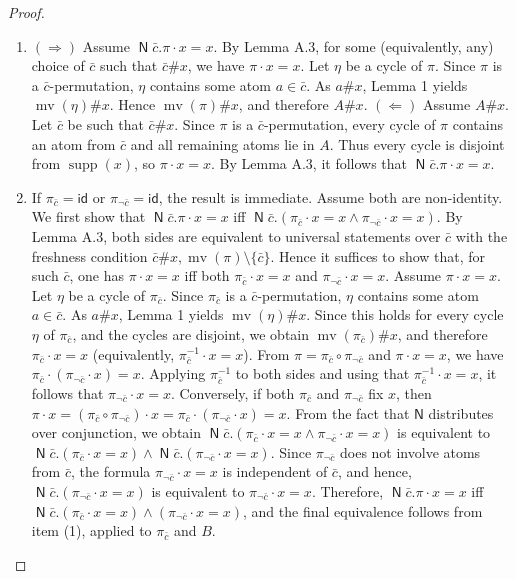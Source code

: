 \documentclass[10pt,a4paper]{amsart}
\newcommand{\newq}{\mathop{\mathsf N}}
\begin{document}
\begin{proof}
\begin{enumerate}
\item $(\Rightarrow)$ Assume $\newq\bar c.\pi\cdot x=x$.
By Lemma A.3, for some (equivalently, any) choice of $\bar c$ such that $\bar c\#x$, we have $\pi\cdot x=x$.
Let $\eta$ be a cycle of $\pi$. Since $\pi$ is a $\bar c$-permutation, $\eta$ contains some atom $a\in\bar c$.
As $a\#x$, Lemma 1 yields $\operatorname{mv}(\eta)\#x$. Hence $\operatorname{mv}(\pi)\#x$, and therefore $A\#x$.
$(\Leftarrow)$ Assume $A\#x$. Let $\bar c$ be such that $\bar c\#x$.
Since $\pi$ is a $\bar c$-permutation, every cycle of $\pi$ contains an atom from $\bar c$ and all remaining atoms lie in $A$.
Thus every cycle is disjoint from $\operatorname{supp}(x)$, so $\pi\cdot x=x$.
By Lemma A.3, it follows that $\newq\bar c.\pi\cdot x=x$.
\item If $\pi_{\bar c}=\mathsf{id}$ or $\pi_{\neg\bar c}=\mathsf{id}$, the result is immediate. Assume both are non-identity.
We first show that $\newq\bar c.\pi\cdot x=x$ iff $\newq\bar c.(\pi_{\bar c}\cdot x=x\land\pi_{\neg\bar c}\cdot x=x)$.
By Lemma A.3, both sides are equivalent to universal statements over $\bar c$ with the freshness condition $\bar c\#x,\operatorname{mv}(\pi)\setminus\{\bar c\}$.
Hence it suffices to show that, for such $\bar c$, one has $\pi\cdot x=x$ iff both $\pi_{\bar c}\cdot x=x$ and $\pi_{\neg\bar c}\cdot x=x$.
Assume $\pi\cdot x=x$. Let $\eta$ be a cycle of $\pi_{\bar c}$. Since $\pi_{\bar c}$ is a $\bar c$-permutation, $\eta$ contains some atom $a\in\bar c$.
As $a\#x$, Lemma 1 yields $\operatorname{mv}(\eta)\#x$. Since this holds for every cycle $\eta$ of $\pi_{\bar c}$, and the cycles are disjoint, we obtain $\operatorname{mv}(\pi_{\bar c})\#x$, and therefore $\pi_{\bar c}\cdot x=x$ (equivalently, $\pi_{\bar c}^{-1}\cdot x=x$).
From $\pi=\pi_{\bar c}\circ\pi_{\neg\bar c}$ and $\pi\cdot x=x$, we have $\pi_{\bar c}\cdot(\pi_{\neg\bar c}\cdot x)=x$.
Applying $\pi_{\bar c}^{-1}$ to both sides and using that $\pi_{\bar c}^{-1}\cdot x=x$, it follows that $\pi_{\neg\bar c}\cdot x=x$.
Conversely, if both $\pi_{\bar c}$ and $\pi_{\neg\bar c}$ fix $x$, then $\pi\cdot x=(\pi_{\bar c}\circ\pi_{\neg\bar c})\cdot x=\pi_{\bar c}\cdot(\pi_{\neg\bar c}\cdot x)=x$.
From the fact that $\mathsf N$ distributes over conjunction, we obtain $\newq\bar c.(\pi_{\bar c}\cdot x=x\land\pi_{\neg\bar c}\cdot x=x)$ is equivalent to $\newq\bar c.(\pi_{\bar c}\cdot x=x)\land\newq\bar c.(\pi_{\neg\bar c}\cdot x=x)$.
Since $\pi_{\neg\bar c}$ does not involve atoms from $\bar c$, the formula $\pi_{\neg\bar c}\cdot x=x$ is independent of $\bar c$, and hence, $\newq\bar c.(\pi_{\neg\bar c}\cdot x=x)$ is equivalent to $\pi_{\neg\bar c}\cdot x=x$.
Therefore, $\newq\bar c.\pi\cdot x=x$ iff $\newq\bar c.(\pi_{\bar c}\cdot x=x)\land(\pi_{\neg\bar c}\cdot x=x)$, and the final equivalence follows from item (1), applied to $\pi_{\bar c}$ and $B$.
\end{enumerate}
\end{proof}
\end{document}
